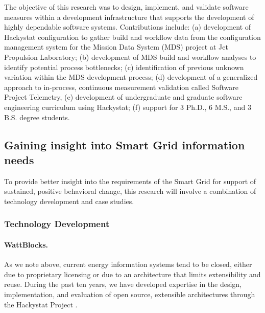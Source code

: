 The objective of this research was to design, implement, and validate
software measures within a development infrastructure that supports the
development of highly dependable software systems.  Contributions include:
(a) development of Hackystat configuration to gather build and workflow
data from the configuration management system for the Mission Data System
(MDS) project at Jet Propulsion Laboratory; (b) development of MDS build
and workflow analyses to identify potential process bottlenecks; (c)
identification of previous unknown variation within the MDS development
process; (d) development of a generalized approach to in-process,
continuous measurement validation called Software Project Telemetry, (e)
development of undergraduate and graduate software engineering curriculum
using Hackystat; (f) support for 3 Ph.D., 6 M.S., and 3 B.S. degree
students.

\subsection{Gaining insight into Smart Grid information needs}
\label{sec:methodology}

To provide better insight into the requirements of the Smart Grid for
support of sustained, positive behavioral change, this research will
involve a combination of  technology development and case studies.

\subsubsection{Technology Development}

\paragraph{WattBlocks.}

As we note above, current energy information systems tend to be closed,
either due to proprietary licensing or due to an architecture that limits
extensibility and reuse.  During the past ten years, we have developed
expertise in the design, implementation, and evaluation of open source,
extensible architectures through the Hackystat Project
\cite{csdl2-06-06,csdl2-09-02,csdl2-09-07,csdl2-09-01}.

